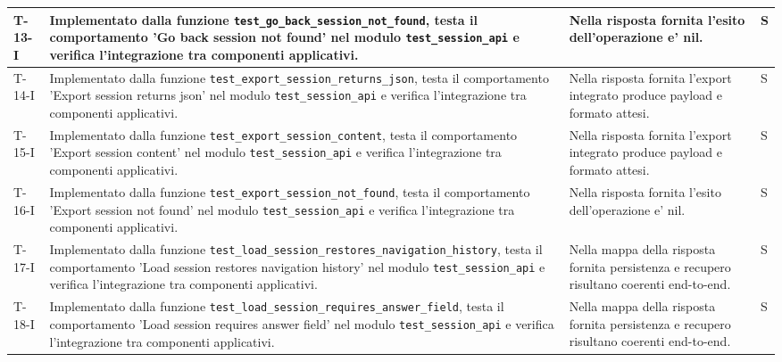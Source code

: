 \documentclass[a4paper,12pt]{article}
\begin{document}
{{\begin{longtable}{|>{\RaggedRight\arraybackslash}p{1.55cm}|>{\RaggedRight\arraybackslash}p{8.0cm}|>{\RaggedRight\arraybackslash}p{4.6cm}|>{\RaggedRight\arraybackslash}p{1.2cm}|}
        \hline
        T-13-I & Implementato dalla funzione \texttt{test\_\allowbreak go\_\allowbreak back\_\allowbreak session\_\allowbreak not\_\allowbreak found}, testa il comportamento 'Go back session not found' nel modulo \texttt{test\_\allowbreak session\_\allowbreak api} e verifica l'integrazione tra componenti applicativi. & Nella risposta fornita l'esito dell'operazione e' nil. & S \\
        \hline
        T-14-I & Implementato dalla funzione \texttt{test\_\allowbreak export\_\allowbreak session\_\allowbreak returns\_\allowbreak json}, testa il comportamento 'Export session returns json' nel modulo \texttt{test\_\allowbreak session\_\allowbreak api} e verifica l'integrazione tra componenti applicativi. & Nella risposta fornita l'export integrato produce payload e formato attesi. & S \\
        \hline
        T-15-I & Implementato dalla funzione \texttt{test\_\allowbreak export\_\allowbreak session\_\allowbreak content}, testa il comportamento 'Export session content' nel modulo \texttt{test\_\allowbreak session\_\allowbreak api} e verifica l'integrazione tra componenti applicativi. & Nella risposta fornita l'export integrato produce payload e formato attesi. & S \\
        \hline
        T-16-I & Implementato dalla funzione \texttt{test\_\allowbreak export\_\allowbreak session\_\allowbreak not\_\allowbreak found}, testa il comportamento 'Export session not found' nel modulo \texttt{test\_\allowbreak session\_\allowbreak api} e verifica l'integrazione tra componenti applicativi. & Nella risposta fornita l'esito dell'operazione e' nil. & S \\
        \hline
        T-17-I & Implementato dalla funzione \texttt{test\_\allowbreak load\_\allowbreak session\_\allowbreak restores\_\allowbreak navigation\_\allowbreak history}, testa il comportamento 'Load session restores navigation history' nel modulo \texttt{test\_\allowbreak session\_\allowbreak api} e verifica l'integrazione tra componenti applicativi. & Nella mappa della risposta fornita persistenza e recupero risultano coerenti end-to-end. & S \\
        \hline
        T-18-I & Implementato dalla funzione \texttt{test\_\allowbreak load\_\allowbreak session\_\allowbreak requires\_\allowbreak answer\_\allowbreak field}, testa il comportamento 'Load session requires answer field' nel modulo \texttt{test\_\allowbreak session\_\allowbreak api} e verifica l'integrazione tra componenti applicativi. & Nella mappa della risposta fornita persistenza e recupero risultano coerenti end-to-end. & S \\

\end{longtable}}}
\end{document}
